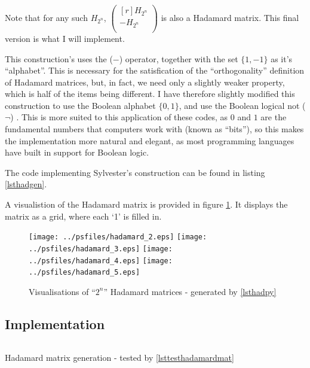 \documentclass[a4paper,11pt]{article}
\newenvironment{longlisting}
{\addvspace{\baselineskip}\captionsetup{type=listing}}
{\addvspace{\baselineskip}}
\begin{document}
    Note that for any such $H_{2^n}$,
    $\begin{pmatrix*}[r] H_{2^n} \\ -H_{2^n} \\ \end{pmatrix*}$
    is also a Hadamard matrix. This final version is what I will implement.

    This construction's uses the ($-$) operator, together with the set
    $\{1,-1\}$ as it's ``alphabet''. This is necessary for the satisfication of
    the ``orthogonality'' definition of Hadamard matrices, but, in fact, we need
    only a slightly weaker property, which is half of the items being different.
    I have therefore slightly modified this construction to use the Boolean
    alphabet $\{0,1\}$, and use the Boolean logical not ($\lnot$)
    \cite{BooleRecords1956Kneale}. This is more suited to this application of
    these codes, as $0$ and $1$ are the fundamental numbers that computers work
    with (known as ``bits''), so this makes the implementation more natural and
    elegant, as most programming languages have built in support for Boolean
    logic.

    The code implementing Sylvester's construction can be found in listing
    \ref{lsthadgen}.

    A visualistion of the Hadamard matrix is provided in
    figure \ref{fighadvis}. It displays the matrix as a grid, where each `1' is
    filled in.

\begin{figure}[H]
\begin{center}
\texttt{[image: ../psfiles/hadamard\_2.eps]}
\texttt{[image: ../psfiles/hadamard\_3.eps]}
\texttt{[image: ../psfiles/hadamard\_4.eps]}
\texttt{[image: ../psfiles/hadamard\_5.eps]}
\end{center}
\caption{Visualisations of ``$2^n$'' Hadamard matrices - generated by
         \ref{lsthadpy}}
\label{fighadvis}
\end{figure}

    \subsection{Implementation}

\begin{longlisting}
\inputminted{python}{../src/hadamard_matrix.py}
\caption{Hadamard matrix generation - tested by \ref{lsttesthadamardmat}}
\label{lsthadgen}
\end{longlisting}
\end{document}
